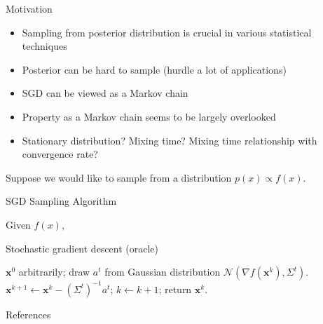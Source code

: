 \documentclass[final]{beamer}
\newlength{\onecolwid}
\newcommand{\bx}{\mathbf{x}}
\newcommand{\N}{\mathscr{N}}
\begin{document}
\begin{frame}[t]
\begin{columns}[t]
\begin{column}{\onecolwid}
\begin{block}{Motivation}
\begin{itemize}
\item Sampling from posterior distribution is crucial in various statistical techniques
\item Posterior can be hard to sample  (hurdle a lot of applications)
\item SGD can be viewed as a Markov chain
\item Property as a Markov chain seems to be largely overlooked
\item Stationary distribution? Mixing time? Mixing time relationship with convergence rate?
\end{itemize}

\end{block}

%
Suppose we would like to sample from a distribution $p(x) \propto f(x)$. 
\begin{block}{SGD Sampling Algorithm}

\begin{algorithm}[H]
{\small
Given $f(x)$, 
\begin{algorithmic}\caption{Stochastic gradient descent (oracle)}\label{Alg:SGD}
 $ \bx^0$ arbitrarily;
\STATE draw $a^t$ from Gaussian distribution $\N(\nabla f(\bx^k), \Sigma^{t})$.
\STATE
$\bx^{k+1} \gets \bx^k - (\Sigma^t)^{-1} a^t$;
\STATE $k\gets k+1$;
\ENDWHILE
\STATE return $\bx^k$.
\end{algorithmic}}
\end{algorithm}


\end{block}


\begin{block}{References}

\nocite{*} %
\small{
\vspace{0.75in}}

\end{block}


\end{column}
\end{columns}
\end{frame}
\end{document}
